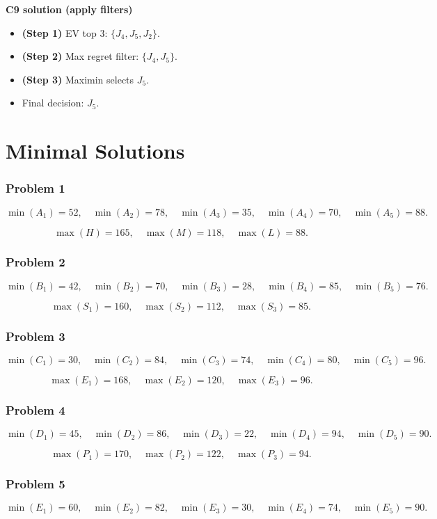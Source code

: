 \begin{ExamProblems}
		\textbf{C9 solution (apply filters)}\par
		\begin{itemize}
			\item \textbf{(Step 1)} EV top 3: $\{J_4,J_5,J_2\}$.
			\item \textbf{(Step 2)} Max regret filter: $\{J_4,J_5\}$.
			\item \textbf{(Step 3)} Maximin selects $J_5$.
			\item Final decision: $J_5$.
		\end{itemize}
		
	\end{ExamProblems}


\part{Minimal Solutions}

\section*{Problem 1}
\[\min(A_1)=52,\quad \min(A_2)=78,\quad \min(A_3)=35,\quad \min(A_4)=70,\quad \min(A_5)=88.\]

\[\max(H)=165,\quad \max(M)=118,\quad \max(L)=88.\]

\section*{Problem 2}
\[\min(B_1)=42,\quad \min(B_2)=70,\quad \min(B_3)=28,\quad \min(B_4)=85,\quad \min(B_5)=76.\]

\[\max(S_1)=160,\quad \max(S_2)=112,\quad \max(S_3)=85.\]

\section*{Problem 3}
\[\min(C_1)=30,\quad \min(C_2)=84,\quad \min(C_3)=74,\quad \min(C_4)=80,\quad \min(C_5)=96.\]

\[\max(E_1)=168,\quad \max(E_2)=120,\quad \max(E_3)=96.\]

\section*{Problem 4}
\[\min(D_1)=45,\quad \min(D_2)=86,\quad \min(D_3)=22,\quad \min(D_4)=94,\quad \min(D_5)=90.\]

\[\max(P_1)=170,\quad \max(P_2)=122,\quad \max(P_3)=94.\]

\section*{Problem 5}
\[\min(E_1)=60,\quad \min(E_2)=82,\quad \min(E_3)=30,\quad \min(E_4)=74,\quad \min(E_5)=90.\]

